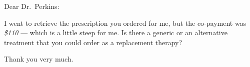 \documentclass[12pt]{facsimile}
\author{\faxauthor}
\begin{document}
\makefaxtitle

\opening{Dear Dr.\ Perkins:}
I went to retrieve the prescription you ordered for me, but the co-payment was \textit{\$110} --- which is a little steep for me. Is there a generic or an alternative treatment that you could order as a replacement therapy?


Thank you very much.
\closing{\ }
\end{document}
